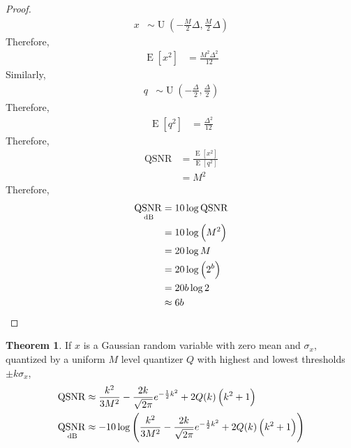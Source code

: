\documentclass[titlepage, fleqn, a4paper, 12pt, twoside]{article}
\theoremstyle{definition}
\theoremstyle{theorem}
\newtheorem{theorem}{Theorem}
\DeclareMathOperator{\expct}{\mathrm{E}}
\DeclareMathOperator{\uniform}{\mathrm{U}}
\DeclareMathOperator{\QSNR}{\mathrm{QSNR}}
\begin{document}
\begin{proof}
	\begin{align*}
		x &\sim \uniform\left( -\frac{M}{2} \Delta,\frac{M}{2} \Delta \right)
	\end{align*}
	Therefore,
	\begin{align*}
		\expct\left[ x^2 \right] &= \frac{M^2 \Delta^2}{12}
	\end{align*}
	Similarly,
	\begin{align*}
		q &\sim \uniform\left( -\frac{\Delta}{2},\frac{\Delta}{2} \right)
	\end{align*}
	Therefore,
	\begin{align*}
		\expct\left[ q^2 \right] &= \frac{\Delta^2}{12}
	\end{align*}
	Therefore,
	\begin{align*}
		\QSNR &= \frac{\expct\left[ x^2 \right]}{\expct\left[ q^2 \right]}\\
		&= M^2
	\end{align*}
	Therefore,
	\begin{align*}
		\QSNR_{\decibel} &= 10 \log \QSNR\\
		&= 10 \log\left( M^2 \right)\\
		&= 20 \log M\\
		&= 20 \log\left( 2^b \right)\\
		&= 20 b \log 2\\
		&\approx 6 b
	\end{align*}
\end{proof}

\begin{theorem}
	If $x$ is a Gaussian random variable with zero mean and $\sigma_x$, quantized by a uniform $M$ level quantizer $Q$ with highest and lowest thresholds $\pm k \sigma_x$,
	\begin{align*}
		\QSNR &\approx \frac{k^2}{3 M^2} - \frac{2 k}{\sqrt{2 \pi}} e^{-\frac{1}{2} k^2} + 2 Q(k) \left( k^2 + 1 \right)\\
		\QSNR_{\decibel} &\approx -10 \log\left( \frac{k^2}{3 M^2} - \frac{2 k}{\sqrt{2 \pi}} e^{-\frac{1}{2} k^2} + 2 Q(k) \left( k^2 + 1 \right) \right)
	\end{align*}
\end{theorem}
\end{document}
